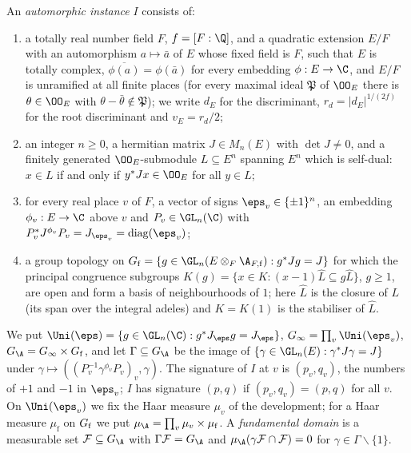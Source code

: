 \begin{definition}\label{pf:rows:instance}
An \emph{automorphic instance} $I$ consists of:
\begin{enumerate}[label=(\alph*)]
\item a totally real number field $F$, $f=[F:\Q]$, and a quadratic extension $E/F$ with an automorphism
$a\mapsto\bar a$ of $E$ whose fixed field is $F$, such that $E$ is totally complex, $\overline{\phi(a)}=\phi(\bar a)$
for every embedding $\phi:E\to\C$, and $E/F$ is unramified at all finite places (for every maximal ideal $\mathfrak P$
of $\OO_E$ there is $\theta\in\OO_E$ with $\theta-\bar\theta\notin\mathfrak P$); we write $d_E$ for the discriminant,
$r_d=|d_E|^{1/(2f)}$ for the root discriminant and $v_E=r_d/2$;
\item an integer $n\ge0$, a hermitian matrix $J\in M_n(E)$ with $\det J\ne0$, and a finitely generated
$\OO_E$-submodule $L\subseteq E^n$ spanning $E^n$ which is self-dual: $x\in L$ if and only if $y^*Jx\in\OO_E$ for all
$y\in L$;
\item for every real place $v$ of $F$, a vector of signs $\eps_v\in\{\pm1\}^n$, an embedding $\phi_v:E\to\C$ above $v$
and $P_v\in\GL_n(\C)$ with $P_v^*J^{\phi_v}P_v=J_{\eps_v}=\mathrm{diag}(\eps_v)$;
\item a group topology on $\rowsGf=\{g\in\GL_n(E\otimes_F\A_{F,\mathrm f}):g^*Jg=J\}$ for which the principal congruence
subgroups $K(g)=\{x\in K:(x-1)\hat L\subseteq g\hat L\}$, $g\ge1$, are open and form a basis of neighbourhoods of $1$; here
$\hat L$ is the closure of $L$ (its span over the integral adeles) and $K=K(1)$ is the stabiliser of $\hat L$.
\end{enumerate}
We put $\Uni(\eps)=\{g\in\GL_n(\C):g^*J_\eps g=J_\eps\}$, $\rowsGinf=\prod_v\Uni(\eps_v)$, $\rowsGA=\rowsGinf\times\rowsGf$, and let
$\Gamma\subseteq\rowsGA$ be the image of $\{\gamma\in\GL_n(E):\gamma^*J\gamma=J\}$ under
$\gamma\mapsto((P_v^{-1}\gamma^{\phi_v}P_v)_v,\gamma)$. The signature of $I$ at $v$ is $(p_v,q_v)$, the numbers of
$+1$ and $-1$ in $\eps_v$; $I$ has signature $(p,q)$ if $(p_v,q_v)=(p,q)$ for all $v$. On $\Uni(\eps_v)$ we fix the
Haar measure $\mu_v$ of the development; for a Haar measure $\mu_{\mathrm f}$ on $G_{\mathrm f}$ we put
$\mu_{\A}=\prod_v\mu_v\times\mu_{\mathrm f}$. A \emph{fundamental domain} is a measurable set $\mathcal F\subseteq\rowsGA$
with $\Gamma\mathcal F=\rowsGA$ and $\mu_{\A}(\gamma\mathcal F\cap\mathcal F)=0$ for $\gamma\in\Gamma\smallsetminus\{1\}$.
\end{definition}

